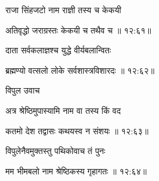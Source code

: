 {\devanagarifont राजा सिंहजटो नाम राज्ञी तस्य च केकयी \thinspace{\dandab} \dontdisplaylinenum }%


{\devanagarifont अतिवृद्धो जराग्रस्तः केकयी च तथैव च {॥ १२:६१॥} \veg\dontdisplaylinenum }%

{\devanagarifont दाता सर्वकलाज्ञश्च युद्धे वीर्यबलान्वितः \thinspace{\dandab} \dontdisplaylinenum }%


{\devanagarifont ब्रह्मण्यो वत्सलो लोके सर्वशास्त्रविशारदः {॥ १२:६२॥} \veg\dontdisplaylinenum }%
 
{\devanagarifont विपुल उवाच {\dandab}\dontdisplaylinenum  }%
 
{\devanagarifont अत्र श्रेष्ठिमुपास्यामि नाम वा तस्य किं वद \thinspace{\danda} \dontdisplaylinenum }%


{\devanagarifont कतमो देश तद्वासः कथयस्व न संशयः {॥ १२:६३॥} \veg\dontdisplaylinenum }%

{\devanagarifont विपुलेनैवमुक्तस्तु पथिकोवाच तं पुनः \thinspace{\dandab} \dontdisplaylinenum }%


{\devanagarifont मम भीमबलो नाम श्रेष्ठिकस्य गृहागतः {॥ १२:६४॥} \veg\dontdisplaylinenum }%

